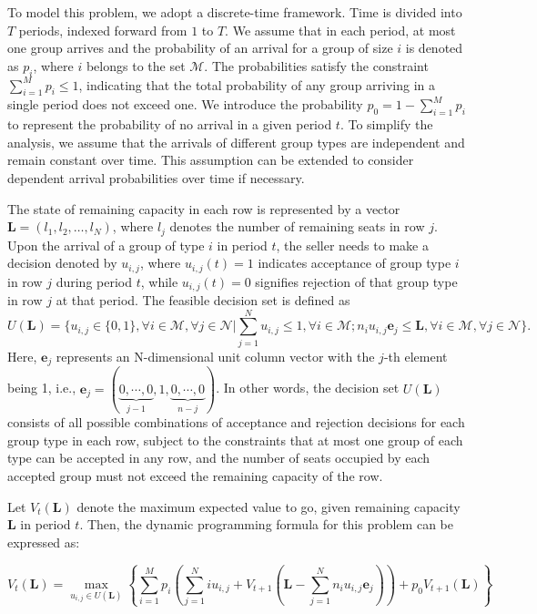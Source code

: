 To model this problem, we adopt a discrete-time framework. Time is divided into $T$ periods, indexed forward from $1$ to $T$. We assume that in each period, at most one group arrives and the probability of an arrival for a group of size $i$ is denoted as $p_i$, where $i$ belongs to the set $\mathcal{M}$. The probabilities satisfy the constraint $\sum_{i=1}^M p_i \leq 1$, indicating that the total probability of any group arriving in a single period does not exceed one. We introduce the probability $p_0 = 1 - \sum_{i=1}^{M} p_i$ to represent the probability of no arrival in a given period $t$. To simplify the analysis, we assume that the arrivals of different group types are independent and remain constant over time. This assumption can be extended to consider dependent arrival probabilities over time if necessary.


The state of remaining capacity in each row is represented by a vector $\mathbf{L} = (l_1, l_2, \ldots, l_N)$, where $l_j$ denotes the number of remaining seats in row $j$. Upon the arrival of a group of type $i$ in period $t$, the seller needs to make a decision denoted by $u_{i,j}$, where $u_{i,j}(t) = 1$ indicates acceptance of group type $i$ in row $j$ during period $t$, while $u_{i,j}(t) = 0$ signifies rejection of that group type in row $j$ at that period. The feasible decision set is defined as $$U(\mathbf{L}) = \{u_{i,j} \in \{0,1\}, \forall i \in \mathcal{M}, \forall j \in \mathcal{N} | \sum_{j=1}^{N} u_{i,j} \leq 1, \forall i \in \mathcal{M}; n_{i}u_{i,j}\mathbf{e}_j \leq \mathbf{L}, \forall i \in \mathcal{M}, \forall j \in \mathcal{N}\}.$$ Here, $\mathbf{e}_j$ represents an N-dimensional unit column vector with the $j$-th element being 1, i.e., $\mathbf{e}_j = (\underbrace{0, \cdots, 0}_{j-1}, 1, \underbrace{0, \cdots, 0}_{n-j})$. In other words, the decision set $U(\mathbf{L})$ consists of all possible combinations of acceptance and rejection decisions for each group type in each row, subject to the constraints that at most one group of each type can be accepted in any row, and the number of seats occupied by each accepted group must not exceed the remaining capacity of the row.


Let $V_t(\mathbf{L})$ denote the maximum expected value to go, given remaining capacity $\mathbf{L}$ in period $t$. Then, the dynamic programming formula for this problem can be expressed as:

\begin{equation}\label{DP}
V_{t}(\mathbf{L}) = \max_{u_{i,j} \in U(\mathbf{L})}\left\{ \sum_{i=1}^{M} p_i ( \sum_{j=1}^{N} i u_{i,j} + V_{t+1}(\mathbf{L}- \sum_{j=1}^{N} n_i u_{i,j}\mathbf{e}_j)) + p_0 V_{t+1}(\mathbf{L})\right\}
\end{equation}

